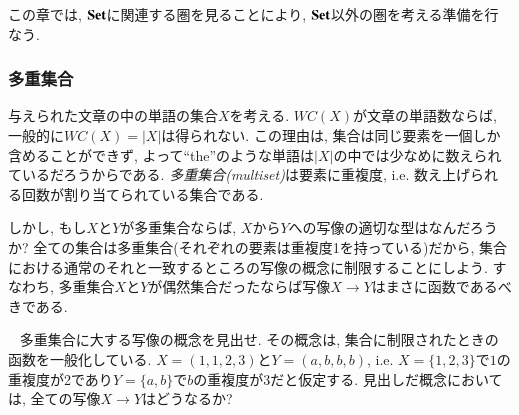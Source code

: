 
この章では, $\mathbf{Set}$に関連する圏を見ることにより, $\mathbf{Set}$以外の圏を考える準備を行なう.


\subsubsection{多重集合}


与えられた文章の中の単語の集合$X$を考える. $WC(X)$が文章の単語数ならば, 一般的に$WC(X)=|X|$は得られない. この理由は, 集合は同じ要素を一個しか含めることができず, よって``the''のような単語は$|X|$の中では少なめに数えられているだろうからである. \emph{多重集合(multiset)}は要素に重複度, i.e. 数え上げられる回数が割り当てられている集合である.


しかし, もし$X$と$Y$が多重集合ならば, $X$から$Y$への写像の適切な型はなんだろうか? 全ての集合は多重集合(それぞれの要素は重複度1を持っている)だから, 集合における通常のそれと一致するところの写像の概念に制限することにしよう. すなわち, 多重集合$X$と$Y$が偶然集合だったならば写像$X\to Y$はまさに函数であるべきである.

\begin{exercise}\label{exc:multiset 1}~
\sexc 多重集合に大する写像の概念を見出せ. その概念は, 集合に制限されたときの函数を一般化している.
\next $X=(1,1,2,3)$と$Y=(a,b,b,b)$, i.e. $X=\{1,2,3\}$で$1$の重複度が2であり$Y=\{a,b\}$で$b$の重複度が3だと仮定する. 見出しだ概念においては, 全ての写像$X\to Y$はどうなるか?
\endsexc
\end{exercise}

